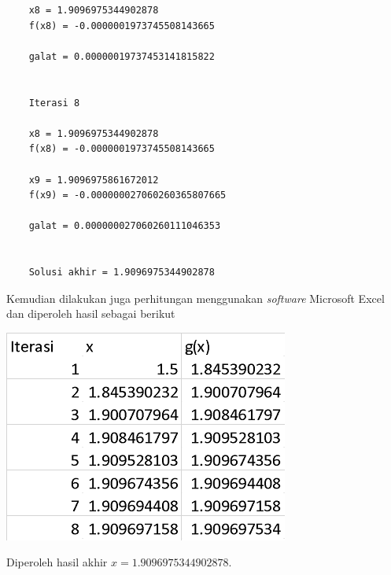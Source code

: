\documentclass[12pt]{article}
\begin{document}
\begin{enumerate}
{\begin{lstlisting}
    x8 = 1.9096975344902878
    f(x8) = -0.0000001973745508143665
    
    galat = 0.00000019737453141815822
    
    
    Iterasi 8
    
    x8 = 1.9096975344902878
    f(x8) = -0.0000001973745508143665
    
    x9 = 1.9096975861672012
    f(x9) = -0.000000027060260365807665
    
    galat = 0.000000027060260111046353
    
    
    Solusi akhir = 1.9096975344902878
        \end{lstlisting}
        Kemudian dilakukan juga perhitungan menggunakan \emph{software} Microsoft Excel dan diperoleh hasil sebagai berikut
        \begin{center}
            \includegraphics[scale=0.6]{gambar5.png}
        \end{center}
        Diperoleh hasil akhir $ x = 1.9096975344902878 $.\bigskip

}
\end{enumerate}
\end{document}
